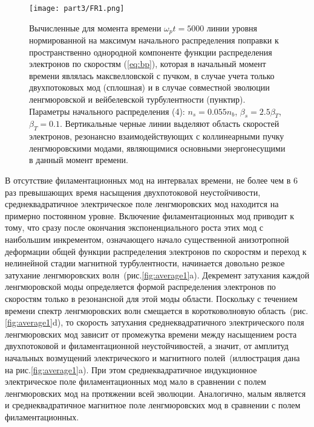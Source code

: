 \begin{figure}[h]
\texttt{[image: part3/FR1.png]}
\centering
{}
\caption{Вычисленные для момента времени $\omega_pt=5000$ линии уровня нормированной на максимум начального распределения поправки к пространственно однородной компоненте функции распределения электронов по скоростям (\ref{eq:bp}), которая в начальный момент времени являлась максвелловской с пучком, в случае учета только двухпотоковых мод (сплошная) и в случае совместной эволюции ленгмюровской и вейбелевской турбулентности (пунктир). Параметры начального распределения (4): $n_s=0.055n_b$, $\beta_s=2.5\beta_T$, $\beta_T=0.1$. Вертикальные черные линии выделяют область скоростей электронов, резонансно взаимодействующих с коллинеарными пучку ленгмюровскими модами, являющимися основными энергонесущими в данный момент времени.}
\label{fig:FR1}
\end{figure}

В отсутствие филаментационных мод на интервалах времени, не более чем в 6 раз превышающих время насыщения двухпотоковой неустойчивости, среднеквадратичное электрическое поле ленгмюровских мод находится на примерно постоянном уровне. Включение филаментационных мод приводит к тому, что сразу после окончания экспоненциального роста этих мод с наибольшим инкрементом, означающего начало существенной анизотропной деформации общей функции распределения электронов по скоростям и переход к нелинейной стадии магнитной турбулентности, начинается довольно резкое затухание ленгмюровских волн~(рис.\ref{fig:average1}a). Декремент затухания каждой ленгмюровской моды определяется формой распределения электронов по скоростям только в резонансной для этой моды области. Поскольку с течением времени спектр ленгмюровских волн смещается в коротковолновую область~(рис.\ref{fig:average1}d), то скорость затухания среднеквадратичного электрического поля ленгмюровских мод зависит от промежутка времени между насыщением роста двухпотоковой и филаментационной неустойчивостей, а значит, от амплитуд начальных возмущений электрического и магнитного полей~(иллюстрация дана на рис.\ref{fig:average1}a). При этом среднеквадратичное индукционное электрическое поле филаментационных мод мало в сравнении с полем ленгмюровских мод на протяжении всей эволюции. Аналогично, малым является и среднеквадратичное магнитное поле ленгмюровских мод в сравнении с полем филаментационных.

